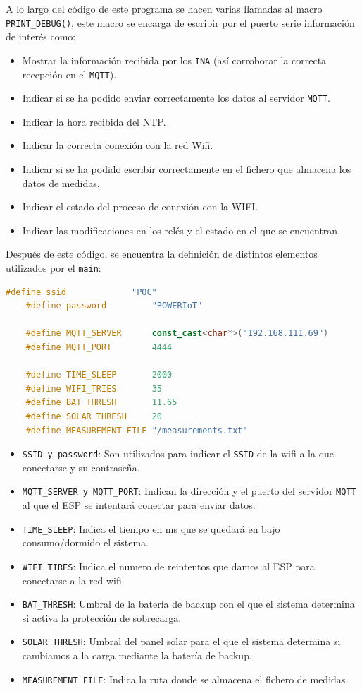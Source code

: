 A lo largo del código de este programa se hacen varias llamadas al macro \texttt{PRINT\_DEBUG()}, este macro se encarga de escribir por el puerto serie información de interés como:
\begin{itemize}
    \item Mostrar la información recibida por los \texttt{INA} (así corroborar la correcta recepción en el \texttt{MQTT}).
    \item Indicar si se ha podido enviar correctamente los datos al servidor \texttt{MQTT}.
    \item Indicar la hora recibida del NTP.
    \item Indicar la correcta conexión con la red Wifi.
    \item Indicar si se ha podido escribir correctamente en el fichero que almacena los datos de medidas.
    \item Indicar el estado del proceso de conexión con la WIFI.
    \item Indicar las modificaciones en los relés y el estado en el que se encuentran.
\end{itemize}

Después de este código, se encuentra la definición de distintos elementos utilizados por el \texttt{main}:
\begin{lstlisting}[captionpos=b, caption={DEFINES de MAIN\_POWER}, language=c++]
    #define ssid             "POC"
    #define password         "POWERIoT"
    
    #define MQTT_SERVER      const_cast<char*>("192.168.111.69")
    #define MQTT_PORT        4444
    
    #define TIME_SLEEP       2000
    #define WIFI_TRIES       35
    #define BAT_THRESH       11.65
    #define SOLAR_THRESH     20
    #define MEASUREMENT_FILE "/measurements.txt"
\end{lstlisting}

\begin{itemize}
    \item \texttt{SSID y password}: Son utilizados para indicar el \texttt{SSID} de la wifi a la que conectarse y su contraseña. 
    \item \texttt{MQTT\_SERVER y MQTT\_PORT}: Indican la dirección y el puerto del servidor \texttt{MQTT} al que el ESP se intentará conectar para enviar datos.
    \item \texttt{TIME\_SLEEP}: Indica el tiempo en ms que se quedará en bajo consumo/dormido el sistema.
    \item \texttt{WIFI\_TIRES}: Indica el numero de reintentos que damos al ESP para conectarse a la red wifi.
    \item \texttt{BAT\_THRESH}: Umbral de la batería de backup con el que el sistema determina si activa la protección de sobrecarga.
    \item \texttt{SOLAR\_THRESH}: Umbral del panel solar para el que el sistema determina si cambiamos a la carga mediante la batería de backup.
    \item \texttt{MEASUREMENT\_FILE}: Indica la ruta donde se almacena el fichero de medidas.
\end{itemize}

